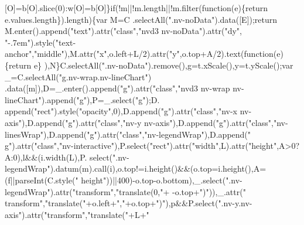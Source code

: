 \begin{DoxyCode}
{      [O]=b[O].slice(0):w[O]=b[O]\}\textcolor{keywordflow}{if}(!m||!m.length||!m.filter(\textcolor{keyword}{function}(e)\{return e.values.length\}).length)\{var M=C
      .selectAll(\textcolor{stringliteral}{".nv-noData"}).data([E]);\textcolor{keywordflow}{return} M.enter().append(\textcolor{stringliteral}{"text"}).attr(\textcolor{stringliteral}{"class"},\textcolor{stringliteral}{"nvd3 nv-noData"}).attr(\textcolor{stringliteral}{"dy"},\textcolor{stringliteral}{
      "-.7em"}).style(\textcolor{stringliteral}{"text-anchor"},\textcolor{stringliteral}{"middle"}),M.attr(\textcolor{stringliteral}{"x"},o.left+L/2).attr(\textcolor{stringliteral}{"y"},o.top+A/2).text(\textcolor{keyword}{function}(e)\{\textcolor{keywordflow}{return} e\}
      ),N\}C.selectAll(\textcolor{stringliteral}{".nv-noData"}).remove(),g=t.xScale(),y=t.yScale();var \_=C.selectAll(\textcolor{stringliteral}{"g.nv-wrap.nv-lineChart"})
      .data([m]),D=\_.enter().append(\textcolor{stringliteral}{"g"}).attr(\textcolor{stringliteral}{"class"},\textcolor{stringliteral}{"nvd3 nv-wrap nv-lineChart"}).append(\textcolor{stringliteral}{"g"}),P=\_.select(\textcolor{stringliteral}{"g"});D.
      append(\textcolor{stringliteral}{"rect"}).style(\textcolor{stringliteral}{"opacity"},0),D.append(\textcolor{stringliteral}{"g"}).attr(\textcolor{stringliteral}{"class"},\textcolor{stringliteral}{"nv-x nv-axis"}),D.append(\textcolor{stringliteral}{"g"}).attr(\textcolor{stringliteral}{"class"},\textcolor{stringliteral}{"nv-y
       nv-axis"}),D.append(\textcolor{stringliteral}{"g"}).attr(\textcolor{stringliteral}{"class"},\textcolor{stringliteral}{"nv-linesWrap"}),D.append(\textcolor{stringliteral}{"g"}).attr(\textcolor{stringliteral}{"class"},\textcolor{stringliteral}{"nv-legendWrap"}),D.append(\textcolor{stringliteral}{"
      g"}).attr(\textcolor{stringliteral}{"class"},\textcolor{stringliteral}{"nv-interactive"}),P.select(\textcolor{stringliteral}{"rect"}).attr(\textcolor{stringliteral}{"width"},L).attr(\textcolor{stringliteral}{"height"},A>0?A:0),l&&(i.width(L),P.
      select(\textcolor{stringliteral}{".nv-legendWrap"}).datum(m).call(i),o.top!=i.height()&&(o.top=i.height(),A=(f||parseInt(C.style(\textcolor{stringliteral}{"
      height"}))||400)-o.top-o.bottom),\_.select(\textcolor{stringliteral}{".nv-legendWrap"}).attr(\textcolor{stringliteral}{"transform"},\textcolor{stringliteral}{"translate(0,"}+ -o.top+\textcolor{stringliteral}{")"})),\_.attr(\textcolor{stringliteral}{"
      transform"},\textcolor{stringliteral}{"translate("}+o.left+\textcolor{stringliteral}{","}+o.top+\textcolor{stringliteral}{")"}),p&&P.select(\textcolor{stringliteral}{".nv-y.nv-axis"}).attr(\textcolor{stringliteral}{"transform"},\textcolor{stringliteral}{"translate("}+L+\textcolor{stringliteral}{"
}}
\end{DoxyCode}
